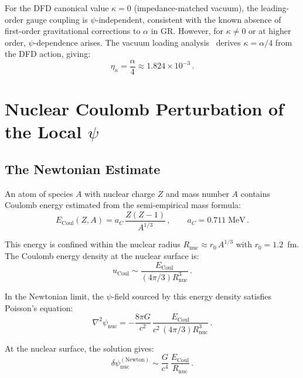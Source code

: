 \documentclass[aps,prd,twocolumn,superscriptaddress,nofootinbib]{revtex4-2}
\newcommand{\kap}{\kappa}
\newcommand{\dpsi}{\delta\psi}
\begin{document}
For the DFD canonical value $\kap = 0$ (impedance-matched vacuum),
the leading-order gauge coupling is $\psi$-independent, consistent
with the known absence of first-order gravitational corrections to
$\alpha$ in GR\@.  However, for $\kap \neq 0$ or at higher order,
$\psi$-dependence arises.  The vacuum loading
analysis~\cite{Alcock2026VL} derives $\kap = \alpha/4$ from the
DFD action, giving:
\begin{equation}\label{eq:eta-numerical}
\eta_\kap = \frac{\alpha}{4} \approx 1.824 \times 10^{-3}\,.
\end{equation}


\section{Nuclear Coulomb Perturbation of the Local $\psi$}
\label{sec:nuclear}

\subsection{The Newtonian Estimate}

An atom of species $A$ with nuclear charge $Z$ and mass number $A$
contains Coulomb energy estimated from the semi-empirical mass
formula:
\begin{equation}\label{eq:coulomb}
E_{\mathrm{Coul}}(Z,A) = a_C\,\frac{Z(Z-1)}{A^{1/3}}\,,
\qquad a_C = 0.711\;\mathrm{MeV}\,.
\end{equation}

This energy is confined within the nuclear radius
$R_{\mathrm{nuc}} \approx r_0\,A^{1/3}$ with $r_0 = 1.2$~fm.
The Coulomb energy density at the nuclear surface is:
\begin{equation}
u_{\mathrm{Coul}} \sim \frac{E_{\mathrm{Coul}}}{(4\pi/3)R_{\mathrm{nuc}}^3}\,.
\end{equation}

In the Newtonian limit, the $\psi$-field sourced by this energy
density satisfies Poisson's equation:
\begin{equation}\label{eq:poisson}
\nabla^2\psi_{\mathrm{nuc}} = -\frac{8\pi G}{c^2}\,
\frac{E_{\mathrm{Coul}}}{c^2\,(4\pi/3)R_{\mathrm{nuc}}^3}\,.
\end{equation}

At the nuclear surface, the solution gives:
\begin{equation}\label{eq:dpsi-bare}
\dpsi_{\mathrm{nuc}}^{(\mathrm{Newton})} \sim \frac{G}{c^4}\,
\frac{E_{\mathrm{Coul}}}{R_{\mathrm{nuc}}}\,.
\end{equation}
\end{document}
